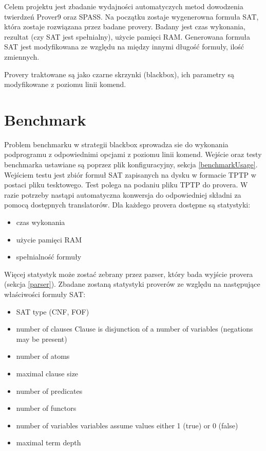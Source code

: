 \documentclass[a4paper,12pt]{article}
\begin{document}
Celem projektu jest zbadanie wydajności automatyczych metod dowodzenia twierdzeń Prover9 oraz SPASS. Na początku zostaje wygenerowna formuła \gls{SAT}, która zostaje rozwiązana przez badane provery. Badany jest czas wykonania, rezultat (czy \gls{SAT} jest spełnialny), użycie pamięci RAM.
Generowana formuła \gls{SAT} jest modyfikowana ze względu na między innymi długość formuły, ilość zmiennych.

Provery traktowane są jako czarne skrzynki (blackbox), ich parametry są modyfikowane z poziomu linii komend.

\section{Benchmark}

Problem benchmarku w strategii blackbox sprowadza sie do wykonania podprogramu z odpowiednimi opcjami z poziomu linii komend.
Wejście oraz testy benchmarka ustawiane są poprzez plik konfiguracyjny, sekcja \ref{benchmarkUsage}.  Wejściem testu jest zbiór formuł \gls{SAT} zapisanych na dysku w formacie TPTP w postaci pliku tesktowego. Test polega na podaniu pliku TPTP do provera. W razie potrzeby nastąpi automatyczna konwersja do odpowiedniej składni za pomocą dostępnych translatorów.
Dla każdego provera dostępne są statystyki:

\begin{itemize}
  \item czas wykonania
  \item użycie pamięci RAM
  \item spełnialność formuły
\end{itemize}

\noindent
Więcej statystyk może zostać zebrany przez parser, który bada wyjście provera (sekcja \ref{parser}).
\newline
Zbadane zostaną statystyki proverów ze względu na następujące właściwości formuły SAT:

\begin{itemize}
  \item SAT type (CNF, FOF)
  \item number of clauses
    Clause is disjunction of a number of variables (negations may be present)
  \item number of atoms
  \item maximal clause size
  \item number of predicates
  \item number of functors
  \item number of variables
    variables assume values either 1 (true) or 0 (false)
  \item maximal term depth
\end{itemize}
\end{document}
